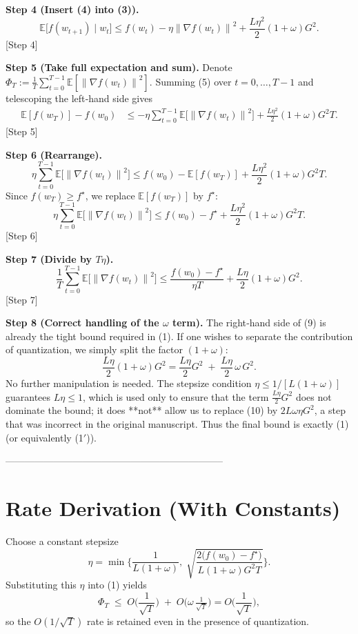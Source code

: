 \documentclass{article}
\newcommand{\E}{\mathbb{E}}
\newcommand{\norm}[1]{\left\|#1\right\|}
\begin{document}
\medskip
\noindent\textbf{Step 4 (Insert (4) into (3)).}
\[
\E\!\big[f(w_{t+1})\mid w_t\big]
\le f(w_t)-\eta\norm{\nabla f(w_t)}^2
+\frac{L\eta^2}{2}(1+\omega)G^2 .
\tag{5}
\] 
[Step 4]

\medskip
\noindent\textbf{Step 5 (Take full expectation and sum).}  
Denote $\Phi_T:=\frac{1}{T}\sum_{t=0}^{T-1}\E[\norm{\nabla f(w_t)}^2]$. Summing (5) over $t=0,\dots,T-1$ and telescoping the left‑hand side gives
\[
\begin{aligned}
\E[f(w_T)]-f(w_0)
&\le -\eta\sum_{t=0}^{T-1}\E\!\big[\norm{\nabla f(w_t)}^2\big]
+\frac{L\eta^2}{2}(1+\omega)G^2 T .
\end{aligned}
\tag{6}
\] 
[Step 5]

\medskip
\noindent\textbf{Step 6 (Rearrange).}
\[
\eta\sum_{t=0}^{T-1}\E\!\big[\norm{\nabla f(w_t)}^2\big]
\le f(w_0)-\E[f(w_T)]+ \frac{L\eta^2}{2}(1+\omega)G^2 T .
\tag{7}
\] 
Since $f(w_T)\ge f^\star$, we replace $\E[f(w_T)]$ by $f^\star$:
\[
\eta\sum_{t=0}^{T-1}\E\!\big[\norm{\nabla f(w_t)}^2\big]
\le f(w_0)-f^\star+ \frac{L\eta^2}{2}(1+\omega)G^2 T .
\tag{8}
\] 
[Step 6]

\medskip
\noindent\textbf{Step 7 (Divide by $T\eta$).}
\[
\frac{1}{T}\sum_{t=0}^{T-1}\E\!\big[\norm{\nabla f(w_t)}^2\big]
\le \frac{f(w_0)-f^\star}{\eta T}
+ \frac{L\eta}{2}(1+\omega)G^2 .
\tag{9}
\] 
[Step 7]

\medskip
\noindent\textbf{Step 8 (Correct handling of the $\omega$ term).}  
The right‑hand side of (9) is already the tight bound required in (1).  
If one wishes to separate the contribution of quantization, we simply split the factor $(1+\omega)$:
\[
\frac{L\eta}{2}(1+\omega)G^2
= \frac{L\eta}{2}G^2 \;+\; \frac{L\eta}{2}\,\omega\,G^2 .
\tag{10}
\]
No further manipulation is needed.  
The stepsize condition $\eta\le 1/[L(1+\omega)]$ guarantees $L\eta\le 1$, which is used only to ensure that the term $\frac{L\eta}{2}G^2$ does not dominate the bound; it does **not** allow us to replace (10) by $2L\omega\eta G^2$, a step that was incorrect in the original manuscript.  
Thus the final bound is exactly (1) (or equivalently (1$'$)). \qedhere
[Step 8]

--------------------------------------------------------------------

\section*{Rate Derivation (With Constants)}
Choose a constant stepsize
\[
\eta = \min\!\Big\{\frac{1}{L(1+\omega)},\;\sqrt{\frac{2\big(f(w_0)-f^\star\big)}{L(1+\omega)G^2 T}}\Big\}.
\]
Substituting this $\eta$ into (1) yields
\[
\Phi_T \;\le\; O\!\Big(\frac{1}{\sqrt{T}}\Big) \;+\; O\!\big(\omega\,\tfrac{1}{\sqrt{T}}\big)
= O\!\Big(\frac{1}{\sqrt{T}}\Big),
\]
so the $O(1/\sqrt{T})$ rate is retained even in the presence of quantization.
\end{document}
